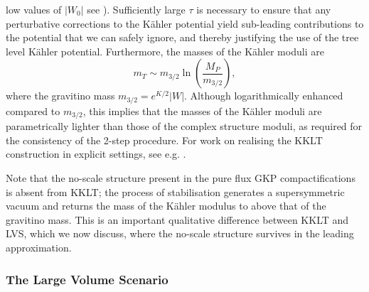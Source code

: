 low values of $|W_0|$ see \cite{Cole:2019enn,Denef:2004dm,hep-th/0312104, Conlon:2004ds}). Sufficiently large $\tau$ is necessary to ensure that any perturbative corrections to the K\"ahler potential yield sub-leading contributions to the
potential that we can safely ignore, and thereby justifying the use of the tree level K\"ahler potential. Furthermore, 
the masses of the K\"ahler moduli are \cite{Choi:2004sx, Choi:2005ge}
$$
  m_{T} \sim m_{3/2} \ln \left( \frac{M_P}{m_{3/2}} \right), 
$$
where the gravitino mass $m_{3/2} = e^{K/2} \vert W \vert$. Although logarithmically enhanced compared to $m_{3/2}$, this implies that the masses of the K\"ahler moduli are parametrically lighter than those of the complex structure moduli, as required for the consistency of
the 2-step procedure. For work on realising  the KKLT construction in explicit settings, see e.g. \cite{Denef:2004dm, Denef:2005mm, Demirtas:2021nlu}.

Note that the no-scale structure present in the pure flux GKP compactifications is absent from KKLT; the process of stabilisation generates a supersymmetric vacuum and returns the mass of the K\"ahler modulus to above that of the gravitino mass. This is an important qualitative difference between KKLT and LVS, which we now discuss, where the no-scale structure survives in the leading approximation.

\subsubsection{The Large Volume Scenario}
 
